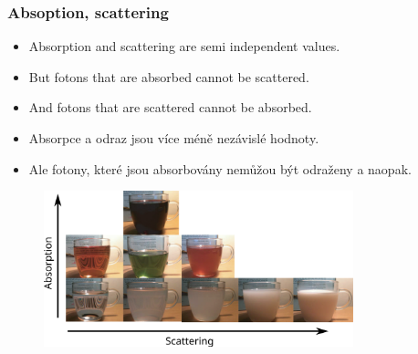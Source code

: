 \begin{frame}\frametitle{Absoption, scattering}
  \scriptsize
  \begin{itemize}
    \item Absorption and scattering are semi independent values.
    \item But fotons that are absorbed cannot be scattered.
    \item And fotons that are scattered cannot be absorbed.
  \end{itemize}
  \begin{itemize}
    \item Absorpce a odraz jsou více méně nezávislé hodnoty.
    \item Ale fotony, které jsou absorbovány nemůžou být odraženy a naopak.
  \end{itemize}
  \begin{figure}[ht]
  \includegraphics[width=0.8\textwidth]{pics/physicallyBasedRendering/scattering_absorption1/scattering_absorption}
  \end{figure}
\end{frame}

